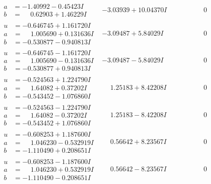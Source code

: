 \documentclass[1p]{elsarticle_modified}
\theoremstyle{definition}
\begin{document}
$$\begin{array}{c|c|c}
\begin{aligned}
a &= -1.40992 - 0.45423 I \\
b &= \phantom{-}0.62903 + 1.46229 I\end{aligned}
 & -3.03939 + 10.04370 I & \phantom{-0.000000 } 0 \\ \hline\begin{aligned}
u &= -0.646745 + 1.161720 I \\
a &= \phantom{-}1.005690 + 0.131636 I \\
b &= -0.530877 - 0.940813 I\end{aligned}
 & -3.09487 + 5.84029 I & \phantom{-0.000000 } 0 \\ \hline\begin{aligned}
u &= -0.646745 - 1.161720 I \\
a &= \phantom{-}1.005690 - 0.131636 I \\
b &= -0.530877 + 0.940813 I\end{aligned}
 & -3.09487 - 5.84029 I & \phantom{-0.000000 } 0 \\ \hline\begin{aligned}
u &= -0.524563 + 1.224790 I \\
a &= \phantom{-}1.64082 + 0.37202 I \\
b &= -0.543452 - 1.076860 I\end{aligned}
 & \phantom{-}1.25183 + 8.42208 I & \phantom{-0.000000 } 0 \\ \hline\begin{aligned}
u &= -0.524563 - 1.224790 I \\
a &= \phantom{-}1.64082 - 0.37202 I \\
b &= -0.543452 + 1.076860 I\end{aligned}
 & \phantom{-}1.25183 - 8.42208 I & \phantom{-0.000000 } 0 \\ \hline\begin{aligned}
u &= -0.608253 + 1.187600 I \\
a &= \phantom{-}1.046230 - 0.532919 I \\
b &= -1.110490 + 0.208651 I\end{aligned}
 & \phantom{-}0.56642 + 8.23567 I & \phantom{-0.000000 } 0 \\ \hline\begin{aligned}
u &= -0.608253 - 1.187600 I \\
a &= \phantom{-}1.046230 + 0.532919 I \\
b &= -1.110490 - 0.208651 I\end{aligned}
 & \phantom{-}0.56642 - 8.23567 I & \phantom{-0.000000 } 0 \\ \hline\begin{aligned}

\end{aligned}
\end{array}$$
\end{document}
